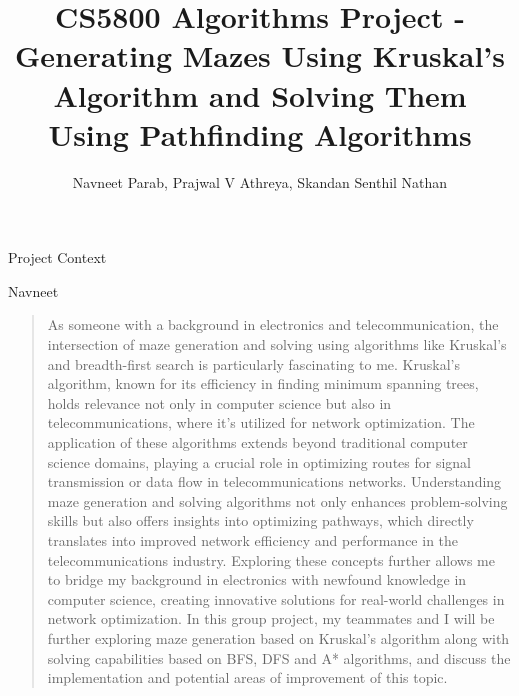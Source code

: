 \documentclass{amsart}
\author{Navneet Parab, Prajwal V Athreya, Skandan Senthil Nathan}
\title{CS5800 Algorithms Project - Generating Mazes Using Kruskal's Algorithm and Solving Them Using Pathfinding Algorithms}
\begin{document}
\maketitle

\begin{section}{Project Context}

    \begin{subsection}{Navneet}
        \begin{quote}
            As someone with a background in electronics and telecommunication, the intersection of maze generation and solving using algorithms like Kruskal's and breadth-first search is particularly fascinating to me. Kruskal's algorithm, known for its efficiency in finding minimum spanning trees, holds relevance not only in computer science but also in telecommunications, where it's utilized for network optimization. The application of these algorithms extends beyond traditional computer science domains, playing a crucial role in optimizing routes for signal transmission or data flow in telecommunications networks. Understanding maze generation and solving algorithms not only enhances problem-solving skills but also offers insights into optimizing pathways, which directly translates into improved network efficiency and performance in the telecommunications industry. Exploring these concepts further allows me to bridge my background in electronics with newfound knowledge in computer science, creating innovative solutions for real-world challenges in network optimization. In this group project, my teammates and I will be further exploring maze generation based on Kruskal's algorithm along with solving capabilities based on BFS, DFS and A* algorithms, and discuss the implementation and potential areas of improvement of this topic.
        \end{quote}
    \end{subsection}


\end{section}
\end{document}
